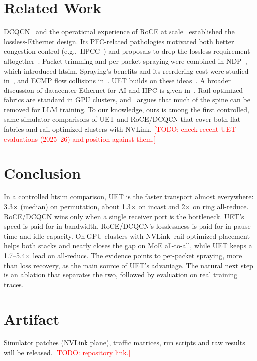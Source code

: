 \documentclass[conference]{IEEEtran}
\newcommand{\todo}[1]{\textcolor{red}{[TODO: #1]}}
\begin{document}
\section{Related Work}

DCQCN~\cite{dcqcn} and the operational experience of RoCE at
scale~\cite{rdma-scale} established the lossless-Ethernet design. Its
PFC-related pathologies motivated both better congestion control
(e.g.,~HPCC~\cite{hpcc}) and proposals to drop the lossless requirement
altogether~\cite{irn}. Packet trimming and per-packet spraying were combined in
NDP~\cite{ndp}, which introduced htsim. Spraying's benefits and its reordering
cost were studied in~\cite{spray}, and ECMP flow collisions in~\cite{hedera}.
UET builds on these ideas~\cite{uec-spec,uec-design,reps}. A broader
discussion of datacenter Ethernet for AI and HPC is given
in~\cite{hoefler-ethernet}. Rail-optimized fabrics are standard in GPU
clusters, and~\cite{railonly} argues that much of the spine can be removed for
LLM training. To our knowledge, ours is among the first controlled,
same-simulator comparisons of UET and RoCE/DCQCN that cover both flat fabrics
and rail-optimized clusters with NVLink.
\todo{check recent UET evaluations (2025--26) and position against them.}

\section{Conclusion}

In a controlled htsim comparison, UET is the faster transport almost everywhere:
3.3$\times$ (median) on permutation, about 1.3$\times$ on incast and 2$\times$ on
ring all-reduce. RoCE/DCQCN wins only when a single receiver port is the
bottleneck. UET's speed is paid for in bandwidth.
RoCE/DCQCN's losslessness is paid for in pause time and idle capacity.
On GPU clusters with NVLink, rail-optimized placement helps both stacks and
nearly closes the gap on MoE all-to-all, while UET keeps a 1.7--5.4$\times$
lead on all-reduce.
The evidence points to per-packet spraying, more than loss
recovery, as the main source of UET's advantage. The natural next step is an
ablation that separates the two, followed by evaluation on real training traces.

\section*{Artifact}
Simulator patches (NVLink plane), traffic
matrices, run scripts and raw results will be released. \todo{repository link.}



\end{document}
